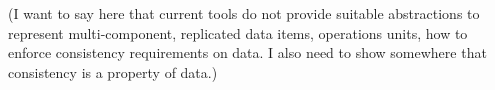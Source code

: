 
(I want to say here that current tools do not provide suitable abstractions to
represent multi-component, replicated data items, operations units, how to
enforce consistency requirements on data. I also need to show somewhere that
consistency is a property of data.)\\

